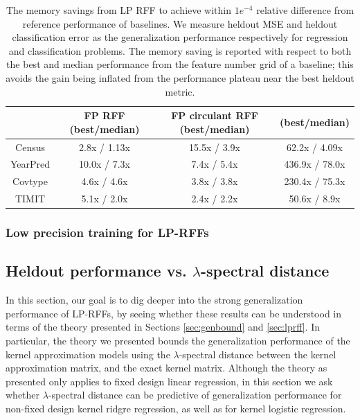 \begin{table}
	\centering
	\begin{tabular}{c c c c}
		\hline
		& FP RFF (best/median) & FP circulant RFF (best/median) & \Nystrom (best/median) \\
		\hline
		\hline
		Census & 2.8x / 1.13x & 15.5x / 3.9x & 62.2x / 4.09x \\
		YearPred & 10.0x / 7.3x & 7.4x / 5.4x & 436.9x / 78.0x \\ 
		Covtype & 4.6x / 4.6x & 3.8x / 3.8x & 230.4x / 75.3x \\ 
		TIMIT & 5.1x / 2.0x & 2.4x / 2.2x & 50.6x / 8.9x \\ 
		\hline
	\end{tabular}
	\caption{The memory savings from LP RFF to achieve within $1e^{-4}$ relative difference from reference performance of baselines. We measure heldout MSE and heldout classification error as the generalization performance respectively for regression and classification problems. The memory saving is reported with respect to both the best and median performance from the feature number grid of a baseline; this avoids the gain being inflated from the performance plateau near the best heldout metric. }
	\label{fig:mem_saving}
\end{table}

\subsubsection{Low precision training for LP-RFFs}
\label{sec:lptrain}


\subsection{Heldout performance vs. $\lambda$-spectral distance}
In this section, our goal is to dig deeper into the strong generalization performance of LP-RFFs, by seeing whether these results can be understood in terms of the theory presented in Sections \ref{sec:genbound} and \ref{sec:lprff}.  In particular, the theory we presented bounds the generalization performance of the kernel approximation models using the $\lambda$-spectral distance between the kernel approximation matrix, and the exact kernel matrix.  Although the theory as presented only applies to fixed design linear regression, in this section we ask whether $\lambda$-spectral distance can be predictive of generalization performance for non-fixed design kernel ridgre regression, as well as for kernel logistic regression.

